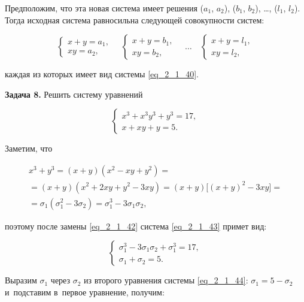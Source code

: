 Предположим, что эта новая система имеет решения
($a_{1}$, $a_{2}$), ($b_{1}$, $b_{2}$), \dots, ($l_{1}$, $l_{2}$).
Тогда исходная система равносильна следующей совокупности систем:

\begin{equation*} 
\begin{cases}
x + y = a_{1}, \\
xy = a_{2},
\end{cases}
\quad
\begin{cases}
x + y = b_{1}, \\
xy = b_{2},
\end{cases}
\quad
\dots
\quad
\begin{cases}
x + y = l_{1}, \\
xy = l_{2},
\end{cases}
\end{equation*} 

\noindent
каждая из которых имеет вид системы \eqref{eq_2_1_40}.

\textbf{Задача 8.} Решить систему уравнений

\begin{equation}\label{eq_2_1_43}
\begin{cases}
x^{3} + x^{3}y^{3} + y^{3 } = 17, \\
x + xy + y = 5.
\end{cases}
\end{equation}

Заметим, что 

\begin{multline*}
x^{3} + y^{3} = (x + y)(x^{2} - xy + y^{2}) = \\
= (x + y)(x^{2} + 2xy + y^{2} - 3xy) = (x + y)\bigr[(x + y)^{2} - 3xy\bigl] = \\
= \sigma_{1}(\sigma_{1}^{2} - 3\sigma_{2}) = \sigma_{1}^{3} - 3\sigma_{1}\sigma_{2},
\end{multline*}

\noindent
поэтому после замены \eqref{eq_2_1_42} система \eqref{eq_2_1_43} примет вид:

\begin{equation}\label{eq_2_1_44}
\begin{cases}
\sigma_{1}^{3} - 3\sigma_{1}\sigma_{2} + \sigma_{1}^{3} = 17, \\
\sigma_{1} + \sigma_{2} = 5.
\end{cases}
\end{equation}

Выразим $\sigma_{1}$ через $\sigma_{2}$ из второго уравнения системы \eqref{eq_2_1_44}:
$\sigma_{1} = 5 - \sigma_{2}$ и~подставим в~первое уравнение, получим:

